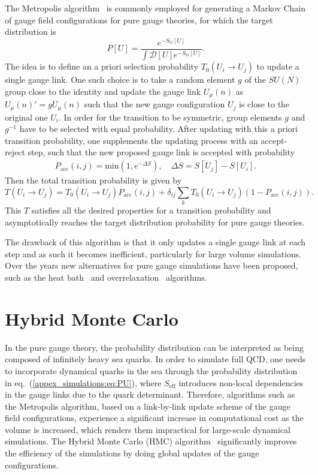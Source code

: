The Metropolis algorithm~\citep{Metropolis:1953am} is commonly employed for generating a Markov Chain of gauge field configurations for pure gauge theories, for which the target distribution is
\begin{equation}
P[U]=\frac{e^{-S_{\textrm{G}}[U]}}{\int\mathcal{D}[U]e^{-S_{\textrm{G}}[U]}}.
\end{equation}
The idea is to define an a priori selection probability $T_0(U_i\rightarrow U_j)$ to update a single gauge link. One such choice is to take a random element $g$ of the $SU(N)$ group close to the identity and update the gauge link $U_{\mu}(n)$ as $U_{\mu}(n)'=gU_{\mu}(n)$ such that the new gauge configuration $U_j$ is close to the original one $U_i$. In order for the transition to be symmetric, group elements $g$ and $g^{-1}$ have to be selected with equal probability. After updating with this a priori transition probability, one supplements the updating process with an accept-reject step, such that the new proposed gauge link is accepted with probability
\begin{gather}
P_{\textrm{acc}}(i,j)=\textrm{min}\left(1,e^{-\Delta S}\right), \quad \Delta S=S[U_j]-S[U_i].
\end{gather}
Then the total transition probability is given by 
\begin{equation}
T(U_i\rightarrow U_j)=T_0(U_i\rightarrow U_j)P_{\textrm{acc}}(i,j)+\delta_{ij}\sum_kT_0(U_i\rightarrow U_j)(1-P_{\textrm{acc}}(i,j)).
\end{equation}
This $T$ satisfies all the desired properties for a transition probability and asymptotically reaches the target distribution probability for pure gauge theories.

The drawback of this algorithm is that it only updates a single gauge link at each step and as such it becomes inefficient, particularly for large volume simulations. Over the years new alternatives for pure gauge simulations have been proposed, such as the heat bath~\citep{Creutz:1980zw} and overrelaxation~\citep{Adler:1981sn,Creutz:1987xi} algorithms.

\section{Hybrid Monte Carlo}

In the pure gauge theory, the probability distribution can be interpreted 
as being composed of infinitely heavy sea quarks. In order to simulate full QCD, one needs to incorporate dynamical quarks in the sea through the probability distribution in eq.~(\ref{appex_simulations:eq:PU}), where $S_{\textrm{eff}}$ introduces non-local dependencies in the gauge links due to the quark determinant. Therefore, algorithms such as the Metropolis algorithm,  based on a link-by-link update scheme of the gauge field configurations, experience a significant increase in computational cost as the volume is increased, which renders them impractical for large-scale dynamical simulations. The Hybrid Monte Carlo (HMC) algorithm~\citep{Duane:1987de,Gottlieb:1987mq} significantly improves the efficiency of the simulations by doing global updates of the gauge configurations.

